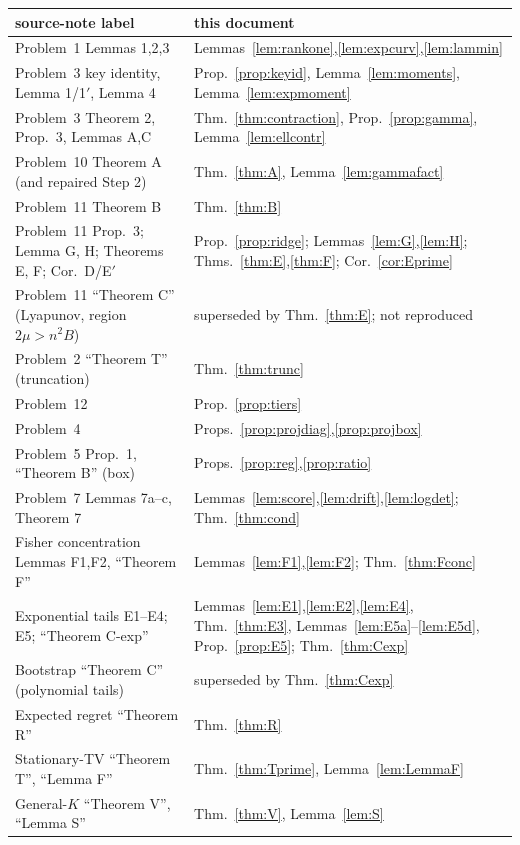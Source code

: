 \begin{center}\small
\begin{tabular}{@{}p{5.6cm}p{7.5cm}@{}}\toprule
source-note label & this document\\\midrule
Problem~1 Lemmas 1,2,3 & Lemmas~\ref{lem:rankone},\ref{lem:expcurv},\ref{lem:lammin}\\
Problem~3 key identity, Lemma 1/1$'$, Lemma 4 & Prop.~\ref{prop:keyid}, Lemma~\ref{lem:moments}, Lemma~\ref{lem:expmoment}\\
Problem~3 Theorem 2, Prop.\ 3, Lemmas A,C & Thm.~\ref{thm:contraction}, Prop.~\ref{prop:gamma}, Lemma~\ref{lem:ellcontr}\\
Problem~10 Theorem A (and repaired Step 2) & Thm.~\ref{thm:A}, Lemma~\ref{lem:gammafact}\\
Problem~11 Theorem B & Thm.~\ref{thm:B}\\
Problem~11 Prop.\ 3; Lemma G, H; Theorems E, F; Cor.\ D/E$'$ & Prop.~\ref{prop:ridge}; Lemmas~\ref{lem:G},\ref{lem:H}; Thms.~\ref{thm:E},\ref{thm:F}; Cor.~\ref{cor:Eprime}\\
Problem~11 ``Theorem C'' (Lyapunov, region $2\mu>n^2B$) & superseded by Thm.~\ref{thm:E}; not reproduced\\
Problem~2 ``Theorem T'' (truncation) & Thm.~\ref{thm:trunc}\\
Problem~12 & Prop.~\ref{prop:tiers}\\
Problem~4 & Props.~\ref{prop:projdiag},\ref{prop:projbox}\\
Problem~5 Prop.\ 1, ``Theorem B'' (box) & Props.~\ref{prop:reg},\ref{prop:ratio}\\
Problem~7 Lemmas 7a--c, Theorem 7 & Lemmas~\ref{lem:score},\ref{lem:drift},\ref{lem:logdet}; Thm.~\ref{thm:cond}\\
Fisher concentration Lemmas F1,F2, ``Theorem F'' & Lemmas~\ref{lem:F1},\ref{lem:F2}; Thm.~\ref{thm:Fconc}\\
Exponential tails E1--E4; E5; ``Theorem C-exp'' & Lemmas~\ref{lem:E1},\ref{lem:E2},\ref{lem:E4}, Thm.~\ref{thm:E3}, Lemmas~\ref{lem:E5a}--\ref{lem:E5d}, Prop.~\ref{prop:E5}; Thm.~\ref{thm:Cexp}\\
Bootstrap ``Theorem C'' (polynomial tails) & superseded by Thm.~\ref{thm:Cexp}\\
Expected regret ``Theorem R'' & Thm.~\ref{thm:R}\\
Stationary-TV ``Theorem T'', ``Lemma F'' & Thm.~\ref{thm:Tprime}, Lemma~\ref{lem:LemmaF}\\
General-$K$ ``Theorem V'', ``Lemma S'' & Thm.~\ref{thm:V}, Lemma~\ref{lem:S}\\

\end{tabular}
\end{center}

